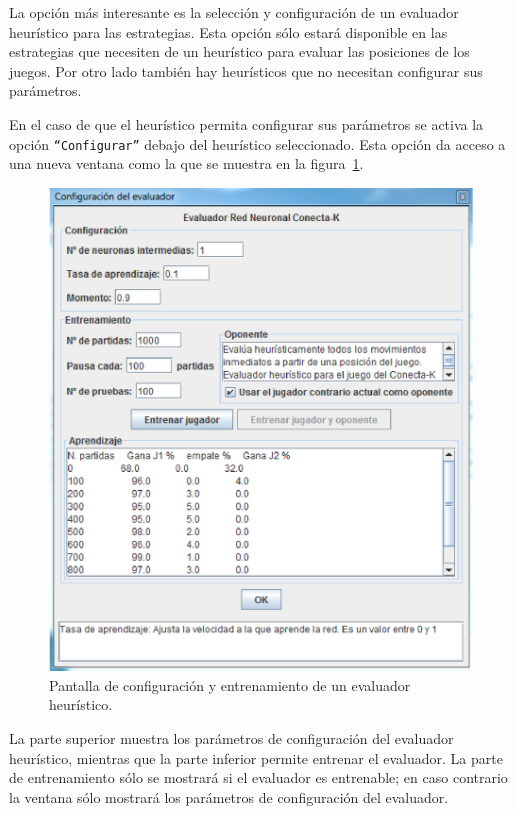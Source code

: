 La opción más interesante es la selección y configuración de un evaluador heurístico para las estrategias.
Esta opción sólo estará disponible en las estrategias que necesiten de un heurístico para evaluar las posiciones de los juegos.
Por otro lado también hay heurísticos que no necesitan configurar sus parámetros.

En el caso de que el heurístico permita configurar sus parámetros se activa la opción \texttt{``Configurar''} debajo del heurístico seleccionado.
Esta opción da acceso a una nueva ventana como la que se muestra en la figura~\ref{fig:ventana_evaluador}.

\begin{figure}[!h]
	\centering
	\includegraphics[scale=0.5]{contenido/apendiceA/imagenes/ventanaEvaluador.eps}
	\caption{Pantalla de configuración y entrenamiento de un evaluador heurístico.}
	\label{fig:ventana_evaluador}
\end{figure}

La parte superior muestra los parámetros de configuración del evaluador heurístico, mientras que la parte inferior permite entrenar el evaluador.
La parte de entrenamiento sólo se mostrará si el evaluador es entrenable; en caso contrario la ventana sólo mostrará los parámetros de configuración del evaluador.

